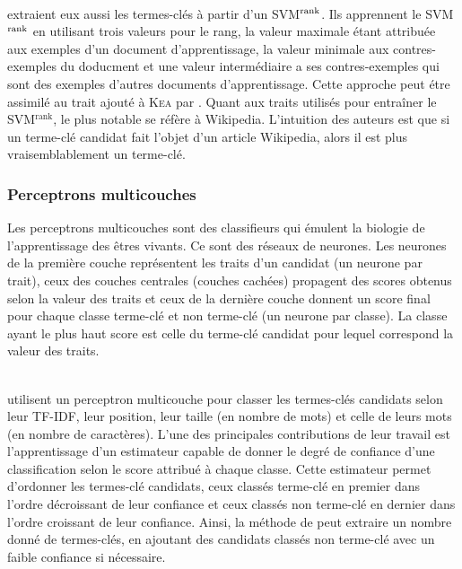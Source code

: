         ~\\ extraient eux aussi les termes-clés à
        partir d'un SVM$^\textnormal{rank}$. Ils apprennent le
        SVM$^\textnormal{rank}$ en utilisant trois valeurs pour le rang, la
        valeur maximale étant attribuée aux exemples d'un document
        d'apprentissage, la valeur minimale aux contres-exemples du doducment et
        une valeur intermédiaire a ses contres-exemples qui sont des exemples
        d'autres documents d'apprentissage. Cette approche peut étre assimilé au
        trait ajouté à \textsc{Kea} par . Quant
        aux traits utilisés pour entraîner le SVM$^\text{rank}$, le plus notable
        se réfère à Wikipedia. L'intuition des auteurs est que si un terme-clé
        candidat fait l'objet d'un article Wikipedia, alors il est plus
        vraisemblablement un terme-clé.

      \subsubsection{Perceptrons multicouches}
      \label{subsubsec:main-state_of_the_art-automatic_keyphrase_extraction-supervised_keyphrase_extraction-neural_network}
        Les perceptrons multicouches sont des classifieurs qui émulent la
        biologie de l'apprentissage des êtres vivants. Ce sont des réseaux de
        neurones. Les neurones de la première couche représentent les traits
        d'un candidat (un neurone par trait), ceux des couches centrales
        (couches cachées) propagent des scores obtenus selon la valeur des
        traits et ceux de la dernière couche donnent un score final pour chaque
        classe \og{}terme-clé\fg{} et \og{}non terme-clé\fg{} (un neurone par
        classe). La classe ayant le plus haut score est celle du terme-clé
        candidat pour lequel correspond la valeur des traits.
        
        ~\\ utilisent un perceptron multicouche
        pour classer les termes-clés candidats selon leur TF-IDF, leur position,
        leur taille (en nombre de mots) et celle de leurs mots (en nombre de
        caractères). L'une des principales contributions de leur travail est
        l'apprentissage d'un estimateur capable de donner le degré de confiance
        d'une classification selon le score attribué à chaque classe. Cette
        estimateur permet d'ordonner les termes-clé candidats, ceux classés
        \og{}terme-clé\fg{} en premier dans l'ordre décroissant de leur
        confiance et ceux classés \og{}non terme-clé\fg{} en dernier dans
        l'ordre croissant de leur confiance. Ainsi, la méthode de
         peut extraire un nombre donné de
        termes-clés, en ajoutant des candidats classés \og{}non terme-clé\fg{}
        avec un faible confiance si nécessaire.

